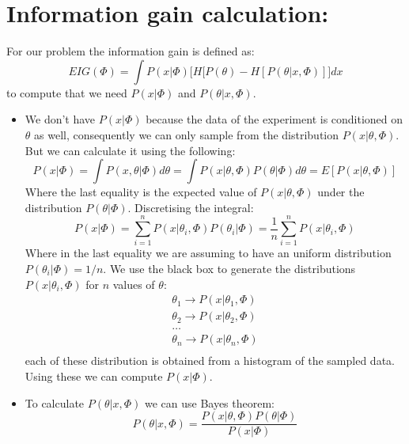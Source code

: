\documentclass{article}
\begin{document}

\section{Information gain calculation: }
For our problem the information gain is defined as:
\begin{equation}\label{infGain}
EIG(\Phi) =\int P(x|\Phi)\Big[ H[P(\theta)-H[P(\theta|x,\Phi)]\Big]dx
\end{equation}
to compute that we need $ P(x|\Phi)$ and $P(\theta|x,\Phi)$.
\begin{itemize}
\item We don't have $P(x|\Phi)$ because the data of the experiment is conditioned on $\theta$ as well, consequently we can only sample from the distribution $P(x |\theta,\Phi)$. But we can calculate it using the following:
\begin{equation}
P(x|\Phi) = \int P(x,\theta | \Phi)d \theta = 
\int P(x| \theta , \Phi) P(\theta | \Phi)d \theta = E[P(x| \theta , \Phi)]
\end{equation}
Where the last equality is the expected value of $P(x| \theta , \Phi)$ under the distribution $P(\theta | \Phi)$.
Discretising the integral:
\begin{equation}
P(x|\Phi) = \sum_{i=1}^{n}  P(x |\theta_i,\Phi)P(\theta_i | \Phi) = \frac{1}{n} \sum_{i=1}^{n}  P(x |\theta_i,\Phi) 
\end{equation}
Where in the last equality we are assuming to have an uniform distribution $P(\theta_i | \Phi) =1/n$.
We use the black box to generate the distributions $P(x |\theta_i,\Phi) $ for $n$ values of $\theta$:
\begin{equation}
\begin{array}{ll}
\theta_1 \rightarrow P(x |\theta_1,\Phi)\\
\theta_2 \rightarrow P(x |\theta_2,\Phi)\\
\dots\\
\theta_n \rightarrow P(x |\theta_n,\Phi)\\
\end{array}
\end{equation}
each of these distribution is obtained from a histogram of the sampled data.
Using these we can compute $P(x|\Phi)$. \\
\item To calculate $P(\theta|x,\Phi)$ we can use Bayes theorem:
\begin{equation}
P(\theta|x,\Phi)=\frac{P(x|\theta,\Phi)P(\theta|\Phi)}{P(x|\Phi)}
\end{equation}
\end{itemize}
\end{document}
